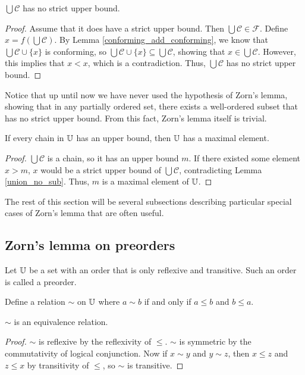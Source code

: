\documentclass[../math.tex]{subfiles}
\begin{document}
\begin{lemma} \label{union_no_sub}
    $\bigcup \mathcal C$ has no strict upper bound.
\end{lemma}
\begin{proof}
    Assume that it does have a strict upper bound.  Then $\bigcup \mathcal C \in
    \mathcal F$.  Define $x = f(\bigcup \mathcal C)$.  By Lemma
    \ref{conforming_add_conforming}, we know that $\bigcup \mathcal C \cup
    \{x\}$ is conforming, so $\bigcup \mathcal C \cup \{x\} \subseteq \bigcup
    \mathcal C$, showing that $x \in \bigcup \mathcal C$.  However, this implies
    that $x < x$, which is a contradiction.  Thus, $\bigcup \mathcal C$ has no
    strict upper bound.
\end{proof}

Notice that up until now we have never used the hypothesis of Zorn's lemma,
showing that in any partially ordered set, there exists a well-ordered subset
that has no strict upper bound.  From this fact, Zorn's lemma itself is trivial.

\begin{theorem} \label{zorn}
    If every chain in $\mathbb{U}$ has an upper bound, then $\mathbb{U}$ has a maximal element.
\end{theorem}
\begin{proof}
    $\bigcup \mathcal C$ is a chain, so it has an upper bound $m$.  If there
    existed some element $x > m$, $x$ would be a strict upper bound of $\bigcup
    \mathcal C$, contradicting Lemma \ref{union_no_sub}.  Thus, $m$ is a maximal
    element of $\mathbb{U}$.
\end{proof}

The rest of this section will be several subsections describing particular
special cases of Zorn's lemma that are often useful.

\subsection{Zorn's lemma on preorders}

Let $\mathbb{U}$ be a set with an order that is only reflexive and transitive.  Such an
order is called a preorder.

\begin{definition}
    Define a relation $\sim$ on $\mathbb{U}$ where $a \sim b$ if and only if $a \leq b$
    and $b \leq a$.
\end{definition}

\begin{instance}
    $\sim$ is an equivalence relation.
\end{instance}
\begin{proof}
    $\sim$ is reflexive by the reflexivity of $\leq$.  $\sim$ is symmetric by
    the commutativity of logical conjunction.  Now if $x \sim y$ and $y \sim z$,
    then $x \leq z$ and $z \leq x$ by transitivity of $\leq$, so $\sim$ is
    transitive.
\end{proof}
\end{document}
